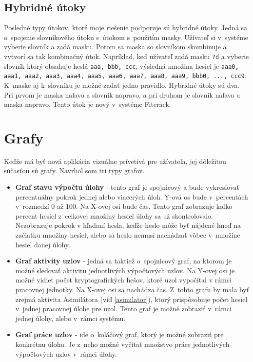 \documentclass[slovak]{fitthesis}
\begin{document}
\subsection{Hybridné útoky} \label{hybridAttack}
Posledné typy útokov, ktoré moje riešenie podporuje sú hybridné útoky. Jedná sa o~spojenie slovníkového útoku s~útokom s~použitím masky. Užívateľ si v~systéme vyberie slovník a zadá masku. Potom sa maska so slovníkom skombinuje a vytvorí sa tak kombinačný útok. Napríklad, keď užívateľ zadá masku \texttt{?d} a vyberie slovník ktorý obsahuje heslá \texttt{aaa, bbb, ccc}, výsledná množina hesiel je 
\texttt{aaa0, aaa1, aaa2, aaa3, aaa4, aaa5, aaa6, aaa7, aaa8, aaa9, bbb0, ..., ccc9}. K~maske aj k~slovníku je možné zadať jedno pravidlo. Hybridné útoky sú dva. Pri prvom je maska naľavo a slovník napravo, a pri druhom je slovník naľavo a maska napravo. Tento útok je nový v~systéme Fitcrack.


\section{Grafy}\label{graphs}
Keďže má byť nová aplikácia vizuálne prívetivá pre užívateľa, jej dôležitou súčasťou sú grafy. Navrhol som tri typy grafov.
\begin{itemize}
    \item \textbf{Graf stavu výpočtu úlohy} \label{progressGraph} - tento graf je spojnicový a bude vykresľovať percentuálny pokrok jednej alebo viacerých úloh. Y-ová os bude v~percentách v~rozmedzí 0 až 100. Na X-ovej osi bude čas. Tento graf zobrazuje koľko percent hesiel z~celkovej množiny hesiel úlohy sa už skontrolovalo. Nezobrazuje pokrok v hľadaní hesla, keďže heslo môže byť nájdené hneď na začiatku množiny hesiel, alebo sa heslo nemusí nachádzať vôbec v~množine hesiel danej úlohy.
    \item \textbf{Graf aktivity uzlov} - jedná sa taktiež o~spojnicový graf, na ktorom je možné sledovať aktivitu jednotlivých výpočtových uzlov. Na Y-ovej osi je možné vidieť počet kryptografických hešov, ktoré uzol vypočítal v rámci pracovnej jednotky. Na X-ovej osi sa nachádza čas. Z~tohto grafu by mala byť zrejmá aktivita Asimilátora (viď \ref{asimilator}), ktorý prispôsobuje počet hesiel v~jednej pracovnej úlohe pre uzol. Tento graf je možné zobraziť v~rámci jednej úlohy, alebo v~rámci systému.
    \item \textbf{Graf práce uzlov} - ide o~koláčový graf, ktorý je možné zobraziť pre konkrétnu úlohu. Je z~neho možné vyčítať množstvo práce jednotlivých výpočtových uzlov v~rámci úlohy.
\end{itemize}
\end{document}
